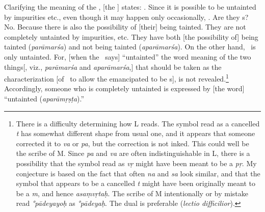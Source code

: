 Clarifying %
the meaning of the \sutra, [the \Bhasyakara] states: .  Since it is possible to be untainted by impurities etc., even though it may happen only occasionally, .  Are they \Isvara s?   No.  Because there is also the possibility of [their] being tainted.  They are not completely untainted by impurities, etc.  They have both [the possibility of] being tainted (\emph{parāmarśa}) and not being tainted (\emph{aparāmarśa}).  On the other hand, \Isvara\ is only untainted.  For, [when the \sutra\ says] ``untainted'' the word meaning of the two things[, viz., \emph{parāmarśa} and \emph{aparāmarśa},] that should be taken as the characterization [of \Isvara\ to allow the emancipated to be \Isvara s], is not revealed.\footnote{There is a difficulty determining how L reads. The symbol read as a cancelled \emph{t} has somewhat different shape from usual one, and it appears that someone corrected it to \emph{va} or \emph{pa}, but the correction is not inked. This could well be the scribe of M\@. Since \emph{pa} and \emph{va} are often indistinguishable in L, there is a possibility that the symbol read as \emph{vṛ} might have been meant to be a \emph{pṛ}. My conjecture is based on the fact that often \emph{na} and \emph{sa} look similar, and that the symbol that appears to be a cancelled \emph{t} might have been originally meant to be a \emph{m}, and hence \emph{asaṃvṛtaḥ}. The scribe of M intentionally or by mistake read \emph{°pādeyayoḥ} as \emph{°pādeyaḥ}. The dual is preferable (\emph{lectio difficilior}).}  Accordingly,  someone who is completely untainted is expressed by [the word] ``untainted (\emph{aparāmṛṣṭa}).''

